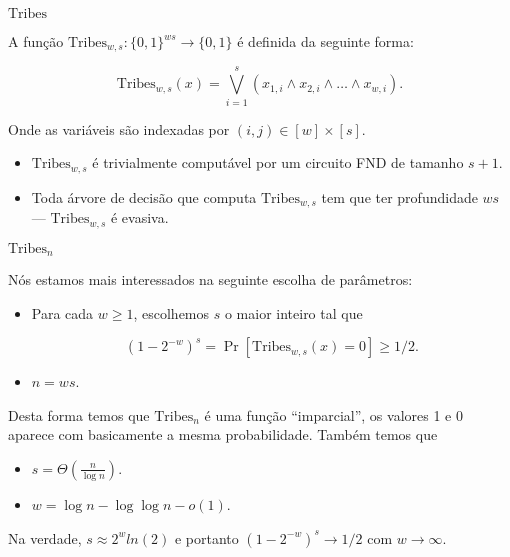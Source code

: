 \documentclass[landscape, 9pt]{beamer}
\newcommand{\binalph}{\{0, 1\}}
\newcommand{\Tribes}{\text{Tribes}}
\begin{document}

\begin{frame} {$\Tribes$}

A função $\Tribes_{w, s}: \binalph^{ws} \to \binalph$ é definida da seguinte forma:

\begin{equation*}
	\Tribes_{w, s}(x) = \bigvee_{i = 1}^{s} (x_{1, i} \land x_{2, i} \land \dots \land x_{w, i}).
\end{equation*}

Onde as variáveis são indexadas por $(i, j) \in [w] \times [s]$.

\begin{itemize}

	\item $\Tribes_{w, s}$ é trivialmente computável por um circuito FND de tamanho $s + 1$.
	
	\item Toda árvore de decisão que computa $\Tribes_{w, s}$ tem que ter profundidade $ws$ --- $\Tribes_{w, s}$ é evasiva.

\end{itemize}

\end{frame}


\begin{frame} {$\Tribes_{n}$}

Nós estamos mais interessados na seguinte escolha de parâmetros:

\begin{itemize}

	\item Para cada $w \geq 1$, escolhemos $s$ o maior inteiro tal que
	
	\begin{equation*}
		(1 - 2^{-w})^{s} = \Pr[\Tribes_{w, s}(x) = 0] \geq 1/2.
	\end{equation*}
	
	\item $n = ws$.

\end{itemize}

Desta forma temos que $\Tribes_{n}$ é uma função ``imparcial'', os valores 1 e 0 aparece com basicamente a mesma probabilidade. Também temos que

\begin{itemize}

	\item $s = \Theta(\frac{n}{\log n})$.
	
	\item $w = \log n - \log\log n - o(1)$.

\end{itemize}

Na verdade, $s \approx 2^{w}ln(2)$ e portanto $(1 - 2^{-w})^{s} \rightarrow 1/2$ com $w \rightarrow \infty$.

\end{frame}
\end{document}
